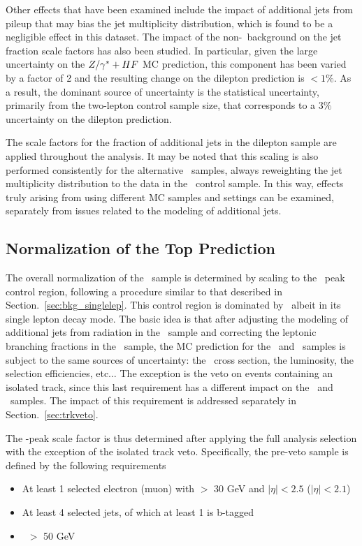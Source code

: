Other effects that have been examined include the impact of 
additional jets from pileup that may bias the jet multiplicity
distribution, which  is found to be a negligible effect in this dataset. The
impact of the non-\ttll\ background on the jet fraction scale factors
has also been studied. In particular, given the large uncertainty on
the $Z/\gamma^*+HF$ MC prediction, this component has been varied by a factor
of 2 and the resulting change on the dilepton prediction is $<1\%$. As
a result, the dominant source of uncertainty is the statistical
uncertainty, primarily from the two-lepton control sample size, that
corresponds to a $3\%$ uncertainty on the dilepton prediction. 

The scale factors for the fraction of additional jets in the dilepton
sample are applied throughout the analysis. It may be noted that this
scaling is also performed consistently for the alternative \ttbar\
samples, always reweighting the jet multiplicity distribution to the
data in the \ttll\ control sample. In this way, effects truly
arising from using different MC samples and settings can be examined,
separately from issues related to the modeling of additional jets. 

\subsection{Normalization of the Top Prediction}

The overall normalization of the \ttbar\ sample is determined by
scaling to the \mt\ peak control region, following a procedure similar 
to that described in Section.~\ref{sec:bkg_singlelep}. This control
region is dominated by \ttbar\, albeit in its single lepton decay
mode. The basic idea is that after adjusting the modeling of
additional jets from radiation in the \ttll\ sample and correcting  
the leptonic branching fractions in the \ttbar\ sample, the MC 
prediction for the \ttlj\ and \ttll\ samples is subject to the same
sources of uncertainty: the \ttbar\ cross section, the luminosity, the
selection efficiencies, etc$\dots$ The exception is the veto on events
containing an isolated track, since this last requirement has a different 
impact on the \ttlj\ and \ttll\ samples. The impact of this
requirement is addressed separately in Section.~\ref{sec:trkveto}. 

The \mt-peak scale factor is thus determined after applying the full
analysis selection with the exception of the isolated track veto. 
Specifically, the pre-veto sample is defined by the following requirements
\begin{itemize}
\item At least 1 selected electron (muon) with \pt $>$ 30 GeV and $|\eta|<2.5$ ($|\eta|<2.1$)
\item At least 4 selected jets, of which at least 1 is b-tagged
\item \met\ $>$ 50 GeV
\end{itemize}

